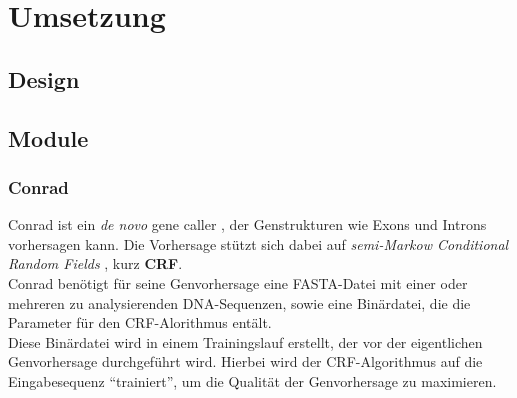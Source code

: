 \chapter{Umsetzung}
\section{Design}
\section{Module}
\subsection{Conrad}
Conrad  ist
ein \textit{de novo}  gene caller ,
der Genstrukturen wie Exons und Introns vorhersagen kann.
Die Vorhersage stützt sich dabei auf \textit{semi-Markow Conditional Random
Fields}  , kurz \textbf{CRF}.
\\ Conrad benötigt für seine Genvorhersage eine FASTA-Datei mit einer oder
mehreren zu analysierenden DNA-Sequenzen, sowie eine Binärdatei, die die
Parameter für den CRF-Alorithmus entält.
\\ Diese Binärdatei wird in einem
Trainingslauf erstellt, der vor der eigentlichen Genvorhersage durchgeführt
wird. Hierbei wird der CRF-Algorithmus auf die Eingabesequenz
\enquote{trainiert}, um die Qualität der Genvorhersage zu maximieren.
\\
